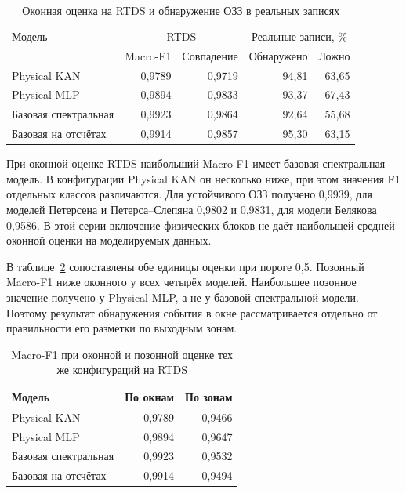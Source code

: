 \begin{table}[htbp]
 \centering
 \small
 \caption{Оконная оценка на RTDS и обнаружение ОЗЗ
 в реальных записях}
 \label{tab:ch4_ozz_comparison}
 \begin{tabular}{p{4.0cm}rrrr}
  \hline
  Модель & \multicolumn{2}{c}{RTDS} &
  \multicolumn{2}{c}{Реальные записи, \%} \\
   & Macro-F1 & Совпадение & Обнаружено & Ложно \\
  \hline
  Physical KAN & 0,9789 & 0,9719 & 94,81 & 63,65 \\
  Physical MLP & 0,9894 & 0,9833 & 93,37 & 67,43 \\
  Базовая спектральная & 0,9923 & 0,9864 & 92,64 & 55,68 \\
  Базовая на отсчётах & 0,9914 & 0,9857 & 95,30 & 63,15 \\
  \hline
 \end{tabular}
\end{table}

При оконной оценке RTDS наибольший Macro-F1 имеет базовая спектральная
модель. В конфигурации Physical KAN он несколько ниже,
при этом значения F1 отдельных классов различаются.
Для устойчивого ОЗЗ получено 0,9939,
для моделей Петерсена и Петерса--Слепяна 0,9802 и 0,9831,
для модели Белякова 0,9586.
В этой серии включение физических блоков
не даёт наибольшей средней оконной оценки на моделируемых данных.

В таблице~\ref{tab:ch4_ozz_units} сопоставлены
обе единицы оценки при пороге 0,5.
Позонный Macro-F1 ниже оконного у всех четырёх моделей.
Наибольшее позонное значение получено у Physical MLP,
а не у базовой спектральной модели.
Поэтому результат обнаружения события в окне
рассматривается отдельно от правильности его разметки
по выходным зонам.

\begin{table}[htbp]
 \centering\small
 \caption{Macro-F1 при оконной и позонной оценке
 тех же конфигураций на RTDS}
 \label{tab:ch4_ozz_units}
 \begin{tabular}{lrr}
  \toprule
  Модель & По окнам & По зонам \\
  \midrule
  Physical KAN & 0,9789 & 0,9466 \\
  Physical MLP & 0,9894 & 0,9647 \\
  Базовая спектральная & 0,9923 & 0,9532 \\
  Базовая на отсчётах & 0,9914 & 0,9494 \\
  \bottomrule
 \end{tabular}
\end{table}

